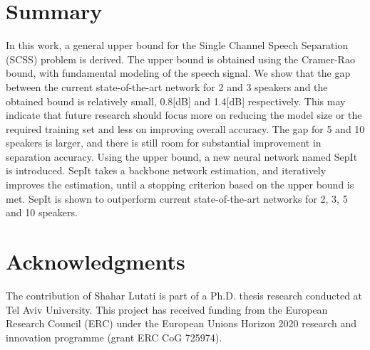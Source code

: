 \documentclass[a4paper]{article}
\theoremstyle{plain}
\theoremstyle{definition}
\theoremstyle{remark}
\begin{document}
\section{Summary}
In this work, a general upper bound for the Single Channel Speech Separation (SCSS) problem is derived. The upper bound is obtained using the Cramer-Rao bound, with fundamental modeling of the speech signal.
We show that the gap between the current state-of-the-art network for 2 and 3 speakers and the obtained bound is relatively small, 0.8[dB] and 1.4[dB] respectively. This may indicate that future research should focus more on reducing the model size or the required training set and less on improving overall accuracy. The gap for 5 and 10 speakers is larger, and there is still room for substantial improvement in separation accuracy. Using the upper bound, a new neural network named SepIt is introduced. SepIt takes a backbone network estimation, and iteratively improves the estimation, until a stopping criterion based on the upper bound is met. SepIt is shown to outperform current state-of-the-art networks for 2, 3, 5 and 10 speakers. 



\section{Acknowledgments}
The contribution of Shahar Lutati is part of a Ph.D. thesis
research conducted at Tel Aviv University.
This project has received funding from the European Research Council (ERC) under the European Unions Horizon 2020 research and innovation programme (grant ERC CoG 725974). 



\end{document}
